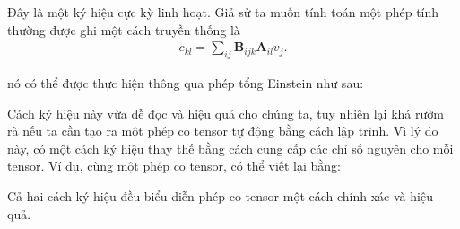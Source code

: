 \documentclass[letterpaper,11pt,english]{sphinxmanual}
\begin{document}
Đây là một ký hiệu cực kỳ linh hoạt. Giả sử ta muốn tính toán một phép
tính thường được ghi một cách truyền thống là
\begin{equation}\label{equation:chapter_appendix_math/geometry-linear-algebric-ops_vn:chapter_appendix_math/geometry-linear-algebric-ops_vn:31}
\begin{split}c_{kl} = \sum_{ij} \mathbf{B}_{ijk}\mathbf{A}_{il}v_j.\end{split}
\end{equation}


nó có thể được thực hiện thông qua phép tổng Einstein như sau:

\begin{sphinxVerbatim}[commandchars=\\\{\}]
   
\end{sphinxVerbatim}



Cách ký hiệu này vừa dễ đọc và hiệu quả cho chúng ta, tuy nhiên lại khá
rườm rà nếu ta cần tạo ra một phép co tensor tự động bằng cách lập
trình. Vì lý do này,  có một cách ký hiệu thay thế bằng cách
cung cấp các chỉ số nguyên cho mỗi tensor. Ví dụ, cùng một phép co
tensor, có thể viết lại bằng:

\begin{sphinxVerbatim}[commandchars=\\\{\}]
 \PYG{p}{[}  \PYG{p}{]}  \PYG{p}{[} \PYG{p}{]}  \PYG{p}{[}\PYG{p}{]} \PYG{p}{[} \PYG{p}{]}
\end{sphinxVerbatim}



Cả hai cách ký hiệu đều biểu diễn phép co tensor một cách chính xác và
hiệu quả.








\subsection{}
\label{\detokenize{chapter_appendix_math/geometry-linear-algebric-ops_vn:dich-tieu-de-phia-tren}}\label{\detokenize{chapter_appendix_math/geometry-linear-algebric-ops_vn:dich-tieu-de-phia-tren-1}}
\end{document}
